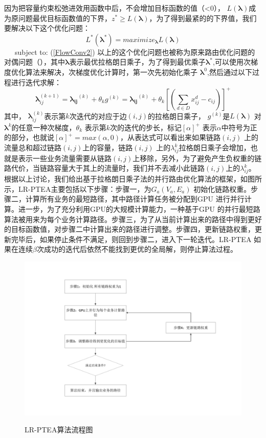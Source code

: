 因为把容量约束松弛进效用函数中后，不会增加目标函数的值（<0）， $L(\mathbf{\lambda})$成为原问题最优目标函数值的下界，$z^* \ge L(\mathbf{\lambda})$，为了得到最紧的的下界值，我们要解决以下这个优化问题：
 \begin{equation}\label{dual}
L^*(\mathbf{\lambda^*}) = maximize_{\mathbf{\lambda}}L(\mathbf{\lambda})
\end{equation}
~~~subject to: (\ref{FlowConv2})
 \vskip 0.2cm
  以上的这个优化问题也被称为原来路由优化问题的对偶问题（），其中$\mathbf{\lambda}$表示最优拉格朗日乘子，为了得到最优乘子$\mathbf{\lambda^*}$,可以使用次梯度优化算法来解决，次梯度优化计算时，第一次先初始化乘子 $\mathbf{\lambda}^0$,然后通过以下过程进行迭代求解：
\begin{equation}\label{iter}
   \mathbf{\lambda}_{ij}^{(k+1)} =\mathbf{\lambda_{ij}}^{(k)}+\theta_{k} g^{(k)}= \mathbf{\lambda_{ij}}^{(k)} + \theta_k[(\sum\limits_{d \in D}x_{ij}^d - c_{ij})]^+
\end{equation}
  其中， $\mathbf{\lambda}_{ij}^{(k)}$表示第$k$次迭代的对应于边$(i,j)$的拉格朗日乘子， $g^{(k)}$是$L(\mathbf{\lambda})$ 对$\mathbf{\lambda}^{k}$的任意一种次梯度，$\theta_k$ 表示第$k$次的迭代的步长，标记$[\alpha]^+$ 表示$\alpha$中符号为正的部分，也就说$[\alpha]^+=max(\alpha, 0)$，从表达式可以看出来如果链路$(i,j)$ 上的流量总和超过链路$(i,j)$上的容量，链路$(i,j)$ 上的$\lambda_{ij}^k$拉格朗日乘子会增加，也就是表示一些业务流量需要从链路$(i,j)$上移除，另外，为了避免产生负权重的链路代价，当链路容量大于其上的流量时，我们并不去减小此链路$(i,j)$上的$\lambda_{ij}^k$。
 根据以上讨论，我们给出基于拉格朗日乘子法的并行路由优化算法的框架，如图所示，LR-PTEA主要包括以下步骤：步骤一，为$G_a(V_a, E_a)$ 初始化链路权重。步骤二，计算所有业务的最短路径，其中路径计算任务被分配到GPU 进行并行计算。进一步，为了充分利用GPU的大规模计算能力，一种基于GPU 的并行最短路算法被用来为每个业务计算路径。步骤三，为了从当前计算出来的路径中得到更好的目标函数值，对步骤二中计算出来的路径进行调整。步骤四，更新链路权重，更新完毕后，如果停止条件不满足，则回到步骤二，进入下一轮迭代。LR-PTEA 如果在连续$\beta$次成功的迭代后依然不能找到更优的全局解，则停止算法过程。
\begin{figure}
  \begin{center}
    {\includegraphics[width=1\textwidth]{figures/lagrange.pdf}}
    \end{center}
  \caption{{\footnotesize{LR-PTEA算法流程图}}}
  \label{IterNum}
\end{figure}
